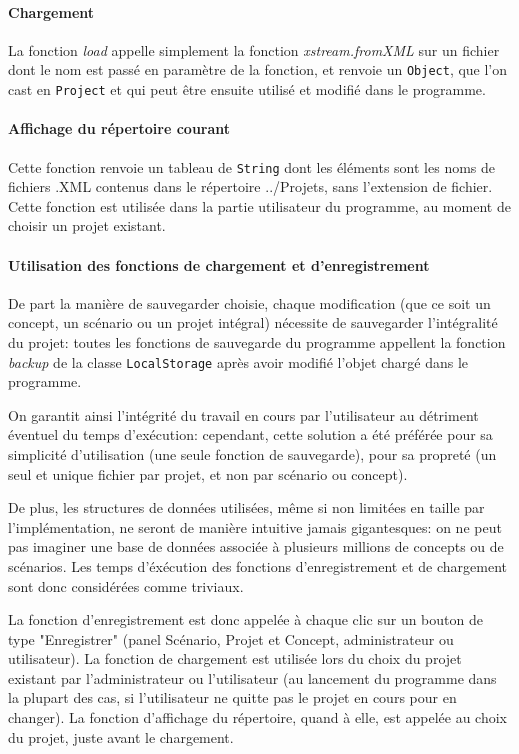 \documentclass[12pt]{report}
\begin{document}
	\paragraph{Chargement}

La fonction \emph{load} appelle simplement la fonction \emph{xstream.fromXML} sur un fichier dont le nom est passé en paramètre de la fonction, et renvoie un \texttt{Object},
que l'on cast en \texttt{Project} et qui peut être ensuite utilisé et modifié dans le programme.

	\paragraph{Affichage du répertoire courant}

Cette fonction renvoie un tableau de \texttt{String} dont les éléments sont les noms de fichiers .XML contenus dans le répertoire ../Projets, sans l'extension
de fichier. Cette fonction est utilisée dans la partie utilisateur du programme, au moment de choisir un projet existant.


	\paragraph{Utilisation des fonctions de chargement et d'enregistrement}

De part la manière de sauvegarder choisie, chaque modification (que ce soit un concept, un scénario ou un projet intégral) nécessite de sauvegarder
l'intégralité du projet: toutes les fonctions de sauvegarde du programme appellent la fonction \emph{backup} de la classe \texttt{LocalStorage} après avoir modifié
l'objet chargé dans le programme.

On garantit ainsi l'intégrité du travail en cours par l'utilisateur au détriment éventuel du temps d'exécution: cependant, cette solution a été
préférée pour sa simplicité d'utilisation (une seule fonction de sauvegarde), pour sa propreté (un seul et unique fichier par projet, et non par scénario ou concept).

De plus, les structures de données utilisées, même si non limitées en taille par l'implémentation, ne seront de manière intuitive jamais gigantesques:
on ne peut pas imaginer une base de données associée à plusieurs millions de concepts ou de scénarios. Les temps d'éxécution des fonctions d'enregistrement
et de chargement sont donc considérées comme triviaux.

La fonction d'enregistrement est donc appelée à chaque clic sur un bouton de type "Enregistrer" (panel Scénario, Projet et Concept, administrateur ou utilisateur).
La fonction de chargement est utilisée lors du choix du projet existant par l'administrateur ou l'utilisateur (au lancement du programme dans la plupart des cas,
si l'utilisateur ne quitte pas le projet en cours pour en changer).
La fonction d'affichage du répertoire, quand à elle, est appelée au choix du projet, juste avant le chargement.
\end{document}
